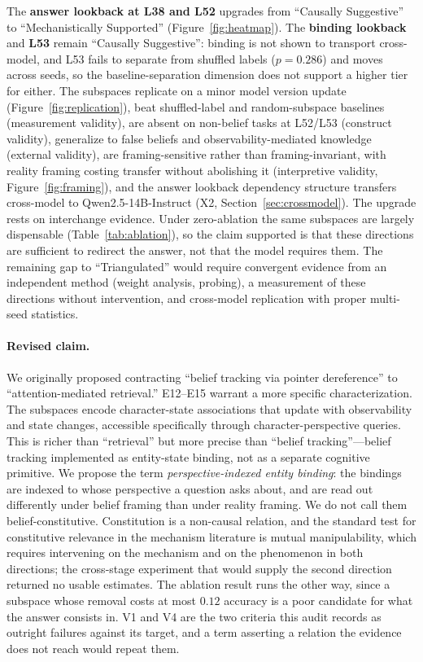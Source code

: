 \documentclass{article}
\begin{document}
The \textbf{answer lookback at L38 and L52} upgrades from ``Causally Suggestive'' to
``Mechanistically Supported'' (Figure~\ref{fig:heatmap}). The \textbf{binding lookback}
and \textbf{L53} remain ``Causally Suggestive'': binding is not shown to transport
cross-model, and L53 fails to separate from shuffled labels ($p = 0.286$) and moves across
seeds, so the baseline-separation dimension does not support a higher tier for either. The subspaces replicate on a minor model version update (Figure~\ref{fig:replication}), beat shuffled-label and random-subspace baselines (measurement validity), are absent on non-belief tasks at L52/L53 (construct validity), generalize to false beliefs and observability-mediated knowledge (external validity), are framing-sensitive rather than framing-invariant, with reality framing costing transfer without abolishing it (interpretive validity, Figure~\ref{fig:framing}), and the answer lookback dependency structure transfers cross-model to Qwen2.5-14B-Instruct (X2, Section~\ref{sec:crossmodel}). The upgrade rests on interchange evidence. Under zero-ablation the same subspaces are largely dispensable (Table~\ref{tab:ablation}), so the claim supported is that these directions are sufficient to redirect the answer, not that the model requires them. The remaining gap to ``Triangulated'' would require convergent evidence from an independent method (weight analysis, probing), a measurement of these directions without intervention, and cross-model replication with proper multi-seed statistics.

\paragraph{Revised claim.}
We originally proposed contracting ``belief tracking via pointer dereference'' to ``attention-mediated retrieval.'' E12--E15 warrant a more specific characterization. The subspaces encode character-state associations that update with observability and state changes, accessible specifically through character-perspective queries. This is richer than ``retrieval'' but more precise than ``belief tracking''---belief tracking implemented as entity-state binding, not as a separate cognitive primitive. We propose the term \emph{perspective-indexed entity binding}: the bindings are indexed to
whose perspective a question asks about, and are read out differently under belief framing
than under reality framing. We do not call them belief-constitutive. Constitution is a
non-causal relation, and the standard test for constitutive relevance in the mechanism
literature is mutual manipulability, which requires intervening on the mechanism and on the
phenomenon in both directions; the cross-stage experiment that would supply the second
direction returned no usable estimates. The ablation result runs the other way, since a
subspace whose removal costs at most $0.12$ accuracy is a poor candidate for what the answer
consists in. V1 and V4 are the two criteria this audit records as outright failures against
its target, and a term asserting a relation the evidence does not reach would repeat them.
\end{document}
